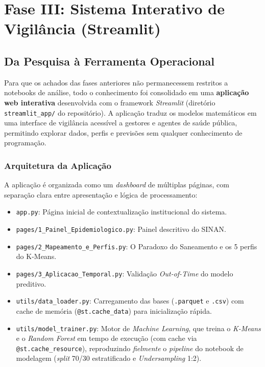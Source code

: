 \documentclass[12pt]{article}
\begin{document}
\newpage

\section{Fase III: Sistema Interativo de Vigilância (Streamlit)}

\subsection{Da Pesquisa à Ferramenta Operacional}

Para que os achados das fases anteriores não permanecessem restritos a notebooks de
análise, todo o conhecimento foi consolidado em uma \textbf{aplicação web interativa}
desenvolvida com o framework \textit{Streamlit} (diretório \texttt{streamlit\_app/} do
repositório). A aplicação traduz os modelos matemáticos em uma interface de vigilância
acessível a gestores e agentes de saúde pública, permitindo explorar dados, perfis e
previsões sem qualquer conhecimento de programação.

\subsubsection{Arquitetura da Aplicação}

A aplicação é organizada como um \textit{dashboard} de múltiplas páginas, com separação
clara entre apresentação e lógica de processamento:

\begin{itemize}
    \item \texttt{app.py}: Página inicial de contextualização institucional do sistema.
    \item \texttt{pages/1\_Painel\_Epidemiologico.py}: Painel descritivo do SINAN.
    \item \texttt{pages/2\_Mapeamento\_e\_Perfis.py}: O Paradoxo do Saneamento e os 5
    perfis do K-Means.
    \item \texttt{pages/3\_Aplicacao\_Temporal.py}: Validação \textit{Out-of-Time} do
    modelo preditivo.
    \item \texttt{utils/data\_loader.py}: Carregamento das bases (\texttt{.parquet} e
    \texttt{.csv}) com cache de memória (\texttt{@st.cache\_data}) para inicialização
    rápida.
    \item \texttt{utils/model\_trainer.py}: Motor de \textit{Machine Learning}, que treina
    o \textit{K-Means} e o \textit{Random Forest} em tempo de execução (com cache via
    \texttt{@st.cache\_resource}), reproduzindo \emph{fielmente} o \textit{pipeline} do
    notebook de modelagem (\textit{split} 70/30 estratificado e \textit{Undersampling}
    1:2).
\end{itemize}
\end{document}
